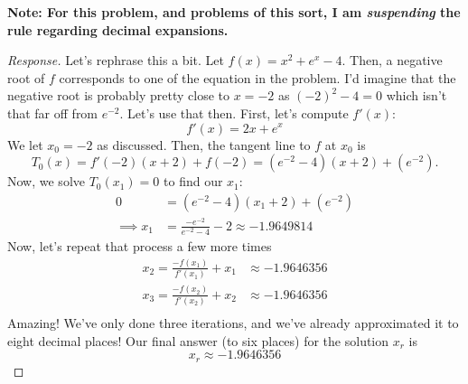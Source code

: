 \documentclass[english]{article}
\theoremstyle{remark}
\theoremstyle{definition}
\begin{document}
\textbf{Note: For this problem, and problems of this sort, I am \emph{suspending} the rule regarding decimal expansions.}
\begin{proof}[Response]
Let's rephrase this a bit. Let $f(x)=x^2+e^x-4$. Then, a negative root of $f$ corresponds to one of the equation in the problem. I'd imagine that the negative root is probably pretty close to $x=-2$ as $(-2)^2-4=0$ which isn't that far off from $e^{-2}$. Let's use that then. First, let's compute $f'(x)$:
\begin{equation}
	f'(x)=2x+e^x
\end{equation}
We let $x_0=-2$ as discussed. Then, the tangent line to $f$ at $x_0$ is $$T_0(x)=f'(-2)(x+2)+f(-2)=(e^{-2}-4)(x+2)+(e^{-2}).$$
Now, we solve $T_0(x_1)=0$ to find our $x_1$:
\begin{align*}0&=(e^{-2}-4)(x_1+2)+(e^{-2})\\
\implies x_1&=\frac{-e^{-2}}{e^{-2}-4}-2\approx -1.9649814
\end{align*}
Now, let's repeat that process a few more times \begin{align*}x_2=\frac{-f(x_1)}{f'(x_1)}+x_1&\approx -1.9646356\\
x_3=\frac{-f(x_2)}{f'(x_2)}+x_2&\approx -1.9646356\\
\end{align*}
Amazing! We've only done three iterations, and we've already approximated it to eight decimal places! Our final answer (to six places) for the solution $x_r$ is $$x_r\approx-1.9646356$$
\end{proof}
\end{document}
